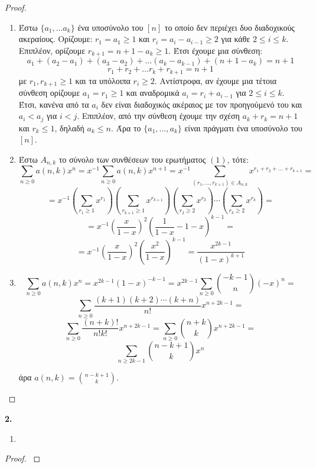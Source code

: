 \documentclass[oneside,a4paper]{article}
\begin{document}
\begin{proof}$ $
	$ $\newline
	\begin{enumerate}

		\item Έστω $\{a_1, \ldots a_k\}$ ένα υποσύνολο του $[n]$ το οποίο δεν περιέχει δυο διαδοχικούς ακεραίους. Ορίζουμε:
		$r_1 = a_1 \geq 1$ και $r_i = a_i - a_{i-1} \geq 2$ για κάθε $2\leq i \leq k$. Επιπλέον, ορίζουμε $r_{k+1} = n+1 - a_k \geq 1$. Έτσι έχουμε μια σύνθεση:
		$$a_1 + (a_2 - a_1) + (a_3 - a_2) + \ldots (a_k - a_{k-1}) + (n+1 - a_k) = n+1$$
		$$r_1 + r_2 +\ldots r_k + r_{k+1} = n+1$$
		με $r_1,r_{k+1} \geq 1$ και τα υπόλοιπα $r_i \geq 2$. Αντίστροφα, αν έχουμε μια τέτοια σύνθεση ορίζουμε $a_1 = r_1 \geq 1$ και αναδρομικά $a_i = r_i + a_{i-1}$ για $2\leq i \leq k$. Έτσι, κανένα από τα $a_i$ δεν είναι διαδοχικός ακέραιος με τον προηγούμενό του και $a_i < a_j$ για $i < j$. Επιπλέον, από την σύνθεση έχουμε την σχέση $a_k + r_k = n+1$ και $r_k \leq 1$, δηλαδή $a_k \leq n$. Άρα το $\{a_1, \ldots,a_k\}$ είναι πράγματι ένα υποσύνολο του $[n]$.  
		
	
		\item Έστω $A_{n,k}$ το σύνολο των συνθέσεων του ερωτήματος $(1)$, τότε:
		$$\sum\limits_{n\geq 0 }a(n,k)x^n = x^{-1}\sum\limits_{n\geq 0 }a(n,k)x^{n+1}  = x^{-1 } \sum\limits_{(r_1, \ldots, r_{k+1}) \in A_{n,k}} x^{r_1 + r_2 + \ldots + r_{k+1}} = $$ 
		$$= x^{-1} \left(\sum\limits_{r_1 \geq 1} x^{r_1} \right) \left(\sum\limits_{r_{k+1} \geq 1} x^{r_{k+1}} \right) \left(\sum\limits_{r_2 \geq 2} x^{r_2} \right) \cdots \left(\sum\limits_{r_k \geq 2} x^{r_k} \right) = $$
		$$= x^{-1} \left( \frac{x}{1-x} \right)^2 \left( \frac1{1-x} -1 -x \right)^{k-1} = $$
		$$= x^{-1} \left( \frac{x}{1-x} \right)^2  \left( \frac{x^2}{1-x}\right)^{k-1} = \frac{x^{2k-1}}{(1-x)^{k+1}} $$

		\item $$\sum\limits_{n\geq 0} a(n,k) x^n = x^{2k-1}(1-x)^{-k-1} = x^{2k-1}\sum\limits_{n\geq 0} \binom{-k-1}{n} (-x)^n = $$
		$$ \sum\limits_{n\geq 0} \frac{(k+1)(k+2) \cdots (k+n)}{n!} x^{n+2k-1} = $$
		$$ \sum\limits_{n\geq 0} \frac{(n+k)!}{n! k!} x^{n+2k-1} = \sum\limits_{n\geq 0 } \binom{n+k}{k} x^{n + 2k -1} = $$
		$$\sum\limits_{n\geq 2k-1} \binom{n-k+1}{k} x^n$$

		άρα $a(n,k) = \binom{n-k+1}{k}$.
	\end{enumerate}
\end{proof}
\pagebreak

\textbf{2. }
\begin{enumerate}
	\item 
\end{enumerate}
\begin{proof}$ $
\end{proof}
\pagebreak
\end{document}
